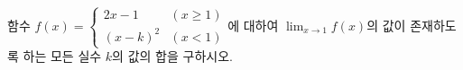 함수 $f(x)=\begin{cases} 2x-1 & (x\ge 1) \\ (x-k)^2 & (x<1) \end{cases}$에 대하여 $\displaystyle\lim_{x\to 1} f(x)$의 값이 존재하도록 하는 모든 실수 $k$의 값의 합을 구하시오.
